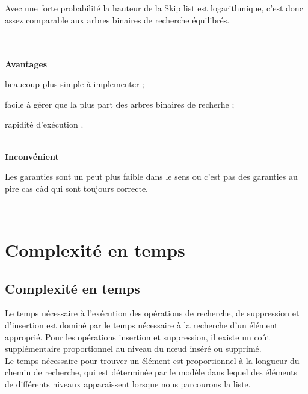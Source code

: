 \documentclass[hidelinks,a4paper,12pt]{article}
\begin{document}
~\\~\\
Avec une forte probabilité la hauteur de la Skip list est logarithmique, c'est donc assez comparable aux arbres binaires de recherche équilibrés.

~\\~\\
\textbf {Avantages} 
\begin{description}[font=$\bullet$~\normalfont\scshape\color{red!50!black}]
	\item beaucoup plus simple à implementer ;
	\item facile à gérer que la plus part des arbres binaires de recherhe ;	
	\item rapidité d'exécution \cite{ArticleZeratti}.
\end{description}


~\\

\textbf {Inconvénient} 
\begin{description}[font=$\bullet$~\normalfont\scshape\color{red!50!black}]
	\item Les garanties sont un peut plus faible dans le sens ou c'est pas des garanties au pire cas càd qui sont toujours correcte.
\end{description}

~\\


\section {Complexité en temps} 

\subsection {Complexité en temps } 
Le temps nécessaire à l’exécution des opérations de recherche, de suppression et d’insertion est dominé par le temps nécessaire à la recherche d'un élément approprié. Pour les opérations insertion et suppression, il existe un coût supplémentaire proportionnel au niveau du nœud inséré ou supprimé.  
\bigskip \\ 
Le temps nécessaire pour trouver un élément est proportionnel à la longueur du chemin de recherche, qui est déterminée par le modèle dans lequel des éléments de différents niveaux apparaissent lorsque nous parcourons la liste. \cite{ArticlePugh} \\


\end{document}
